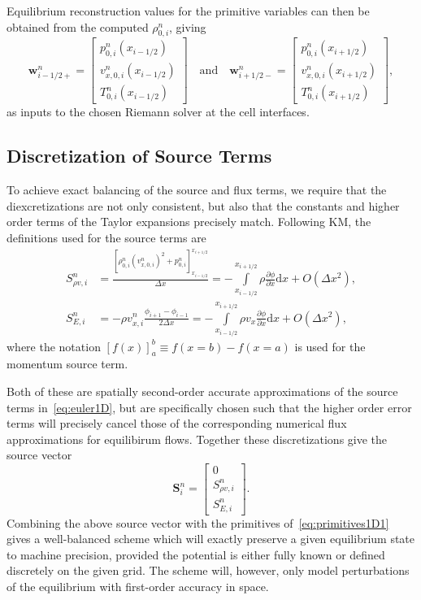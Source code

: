 Equilibrium reconstruction values for the primitive variables can then be obtained from the computed $\rho_{0,i}^n$, giving
\begin{equation} \label{eq:primitives1D1}
\mathbf{w}_{i-1/2+}^n=
\begin{bmatrix}
p_{0,i}^n(x_{i-1/2}) \\ v_{x,0,i}^n(x_{i-1/2}) \\ T_{0,i}^n(x_{i-1/2})
\end{bmatrix}
\quad \textrm{and} \quad \mathbf{w}_{i+1/2-}^n=
\begin{bmatrix}
p_{0,i}^n(x_{i+1/2}) \\ v_{x,0,i}^n(x_{i+1/2}) \\ T_{0,i}^n(x_{i+1/2})
\end{bmatrix},
\end{equation}
as inputs to the chosen Riemann solver at the cell interfaces.

\subsection{Discretization of Source Terms}
\label{subsec:sources}

To achieve exact balancing of the source and flux terms, we require that the diexcretizations are not only consistent, but also that the constants and higher order terms of the Taylor expansions precisely match. Following KM, the definitions used for the source terms are
\begin{align}
S_{\rho v,i}^n&=\frac{\left[\rho_{0,i}^n(v_{x,0,i}^n)^2+p_{0,i}^n\right]_{x_{i-1/2}}^{x_{i+1/2}}}{\Delta x}=-\int\limits_{x_{i-1/2}}^{x_{i+1/2}}\rho \frac{\partial \phi}{\partial x}\textrm{d}x+O\left(\Delta x^2\right), \label{eq:momentumSource} \\
S_{E,i}^n&=-\rho v_{x,i}^n\frac{\phi_{i+1}-\phi_{i-1}}{2\Delta x}=-\int\limits_{x_{i-1/2}}^{x_{i+1/2}}\rho v_x \frac{\partial \phi}{\partial x}\textrm{d}x+O\left(\Delta x^2\right), \label{eq:energySource}
\end{align}
where the notation $\left[f(x)\right]_a^b\equiv f(x=b)-f(x=a)$ is used for the momentum source term.

Both of these are spatially second-order accurate approximations of the source terms in~\eqref{eq:euler1D}, but are specifically chosen such that the higher order error terms will precisely cancel those of the corresponding numerical flux approximations for equilibirum flows. Together these discretizations give the source vector
\begin{equation}
\mathbf{S}_i^n=
\begin{bmatrix}
0 \\ S_{\rho v,i}^n \\ S_{E,i}^n
\end{bmatrix}.
\end{equation}
Combining the above source vector with the primitives of~\eqref{eq:primitives1D1} gives a well-balanced scheme which will exactly preserve a given equilibrium state to machine precision, provided the potential is either fully known or defined discretely on the given grid. The scheme will, however, only model perturbations of the equilibrium with first-order accuracy in space.

